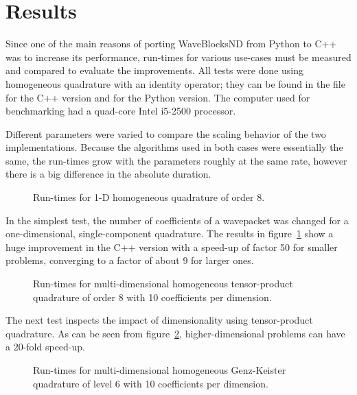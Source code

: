 \section{Results}
\label{sec:results}

Since one of the main reasons of porting WaveBlocksND from Python to C++ was to
increase its performance, run-times for various use-cases must be measured and
compared to evaluate the improvements.
All tests were done using homogeneous quadrature with an identity operator;
they can be found in the file  for the
C++ version and  for the Python version.
The computer used for benchmarking had a quad-core Intel i5-2500 processor.

Different parameters were varied to compare the scaling behavior of the two
implementations.
Because the algorithms used in both cases were essentially the same, the
run-times grow with the parameters roughly at the same rate, however there is a
big difference in the absolute duration.

\begin{figure}
  \center
  
  \caption{Run-times for 1-D homogeneous quadrature of order 8.}
  \label{fig:speedup1d}
\end{figure}

In the simplest test, the number of coefficients of a wavepacket was changed
for a one-dimensional, single-component quadrature.
The results in figure~\ref{fig:speedup1d} show a huge improvement in the C++
version with a speed-up of factor 50 for smaller problems, converging to a
factor of about 9 for larger ones.

\begin{figure}
  \center
  
  \caption{Run-times for multi-dimensional homogeneous tensor-product quadrature
    of order 8 with 10 coefficients per dimension.}
  \label{fig:speedupnd}
\end{figure}

The next test inspects the impact of dimensionality using tensor-product
quadrature.
As can be seen from figure~\ref{fig:speedupnd}, higher-dimensional problems can
have a 20-fold speed-up.

\begin{figure}
  \center
  
  \caption{Run-times for multi-dimensional homogeneous Genz-Keister quadrature
    of level 6 with 10 coefficients per dimension.}
  \label{fig:speedupgenzkeister}
\end{figure}

